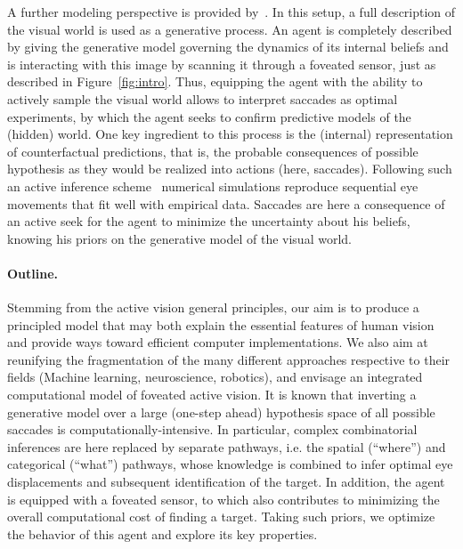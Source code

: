 A further modeling perspective is provided by~\citep{Friston12}. In this setup, a full description of the visual world is used as a generative process. An agent is completely described by giving the generative model governing the dynamics of its internal beliefs and is interacting with this image by scanning it through a foveated sensor, just as described in Figure~\ref{fig:intro}. Thus, equipping the agent with the ability to actively sample the visual world %
allows to interpret saccades as optimal experiments, by which the agent seeks to confirm predictive models of the (hidden) world. One key ingredient to this process is the (internal) representation of counterfactual predictions, that is, the probable consequences of possible hypothesis as they would be realized into actions (here, saccades). Following such an active inference scheme~\citep{Mirza18} numerical simulations reproduce sequential eye movements that fit well with empirical data. %
Saccades %
are here a consequence of an active seek for the agent to minimize the uncertainty about his beliefs, knowing his priors on the generative model of the visual world. 

\paragraph{Outline.}
Stemming from the active vision general principles, our aim is to produce a principled model that may both explain the essential features of human vision and provide ways toward efficient computer implementations. We also aim at reunifying the fragmentation of the many different approaches respective to their fields (Machine learning, neuroscience, robotics), and envisage an integrated computational model of foveated active vision. It is known that inverting a generative model over a large (one-step ahead) hypothesis space of all possible saccades is computationally-intensive. %
In particular, complex combinatorial inferences are here replaced by separate pathways, i.e. the spatial (``where'') and categorical (``what'') pathways, whose knowledge is combined to infer optimal eye displacements and subsequent identification of the target. 
In addition, the agent is equipped with a foveated sensor, %
to which also contributes to minimizing the overall computational cost of finding a target. Taking such priors, we optimize the behavior of this agent and explore its key properties.

